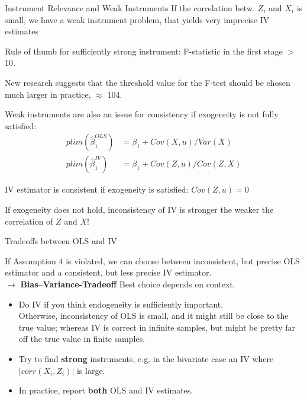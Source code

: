 \documentclass[9pt,aspectratio=169, xcolor=dvipsnames]{beamer}
\begin{document}
\begin{frame}{Instrument Relevance and Weak Instruments}
\linespread{1.3}\selectfont %
    If the correlation betw. $Z_i$ and $X_i$ is small, we have a \alert{weak instrument} problem, that yields very imprecise IV estimates


    Rule of thumb for sufficiently strong instrument:  F-statistic in the first stage $>$ 10.

    New research suggests that the threshold value for the
F-test should be chosen much larger in practice, $\approx$ 104.
    \bigskip


\pause 
Weak instruments are also an issue for consistency if exogeneity is not fully satisfied:
\begin{align*}
    plim(\hat{\beta}_1^{OLS}) &= \beta_1 + Cov (X, u)/Var(X)   \\
plim(\hat{\beta}_1^{IV}) &= \beta_1 + Cov (Z, u)/Cov(Z,X)
\end{align*}

IV estimator is consistent if exogeneity is satisfied: $Cov(Z, u) = 0$

If exogeneity does not hold, inconsistency of IV is stronger the weaker the correlation of $Z$ and $X$!


\end{frame}

\begin{frame}{Tradeoffs between OLS and IV}

If Assumption 4 is violated, we can choose between inconsistent, but precise OLS estimator and a consistent, but less precise IV estimator. \\
$\rightarrow$ \textbf{\alert{Bias–Variance-Tradeoff}}
\pause
Best choice depends on context.
\begin{itemize}
    \item Do IV if you think endogeneity is sufficiently important. \\
    Otherwise, inconsistency of OLS is small, and it might still be close to the true value; whereas IV is correct in infinite samples, but might be pretty far off the true value in finite samples.
    \item Try to find \textbf{strong} instruments, e.g. in the bivariate case an IV where  $|corr(X_i, Z_i)|$ is large. \pause
    \item[$\rightarrow$] In practice, report \textbf{both} OLS and IV estimates. 
\end{itemize}
\end{frame}
\end{document}
